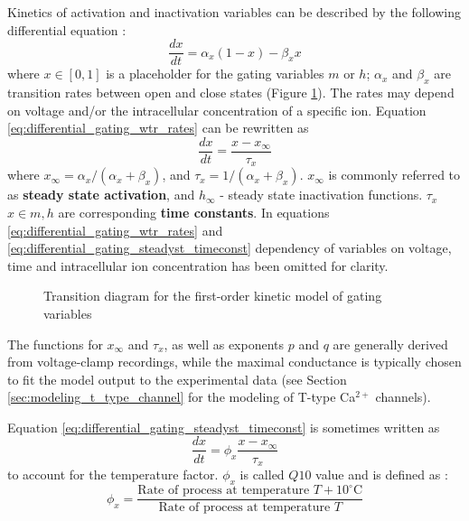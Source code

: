 \documentclass[../main.tex]{subfiles}
\begin{document}
Kinetics of activation and inactivation variables can be described by the following differential equation \parencite{wangModelTtypeCalcium1991}:
\begin{equation} \label{eq:differential_gating_wtr_rates}
    \frac{dx}{dt} = \alpha_x (1 - x) - \beta_x x
\end{equation}
where $x \in [0, 1]$ is a placeholder for the gating variables $m$ or $h$; $\alpha_x$ and $\beta_x$ are transition rates between open and close states (Figure \ref{fig:gating_first_order_kinetics}). The rates may depend on voltage and/or the intracellular concentration of a specific ion. Equation \ref{eq:differential_gating_wtr_rates} can be rewritten as
\begin{equation} \label{eq:differential_gating_steadyst_timeconst}
    \frac{dx}{dt} = \frac{x - x_{\infty}}{\tau_x}
\end{equation}
where $x_{\infty}=\alpha_x/(\alpha_x + \beta_x)$, and $\tau_{x}=1/(\alpha_x + \beta_x)$.
$x_\infty$ is commonly referred to as \textbf{steady state activation}, and $h_\infty$ - steady state inactivation functions. $\tau_{x}$ $x\in{m,h}$ are corresponding \textbf{time constants}.
In equations \ref{eq:differential_gating_wtr_rates} and \ref{eq:differential_gating_steadyst_timeconst} dependency of variables on voltage, time and intracellular ion concentration has been omitted for clarity.

\begin{figure}[!t]
    \centering
    \caption{Transition diagram for the first-order kinetic model of gating variables}
    \label{fig:gating_first_order_kinetics}
\end{figure}

The functions for $x_\infty$ and $\tau_x$, as well as exponents $p$ and $q$ are generally derived from voltage-clamp recordings, while the maximal conductance is typically chosen to fit the model output to the experimental data (see Section \ref{sec:modeling_t_type_channel} for the modeling of T-type Ca$^{2+}$ channels).

Equation \ref{eq:differential_gating_steadyst_timeconst} is sometimes written as
\begin{equation}\label{eq:differential_gating_steadyst_timeconst_q10}
    \frac{dx}{dt} = \phi_x\frac{x - x_{\infty}}{\tau_x}
\end{equation}
to account for the temperature factor. $\phi_x$ is called $Q10$ value and is defined as \parencite{sterrattQ10EffectTemperature2015}:
\begin{equation}
    \phi_x=\frac{\text{Rate of process at temperature $T+10^\circ$C}}{\text{Rate of process at temperature $T$}}
\end{equation}
\end{document}
